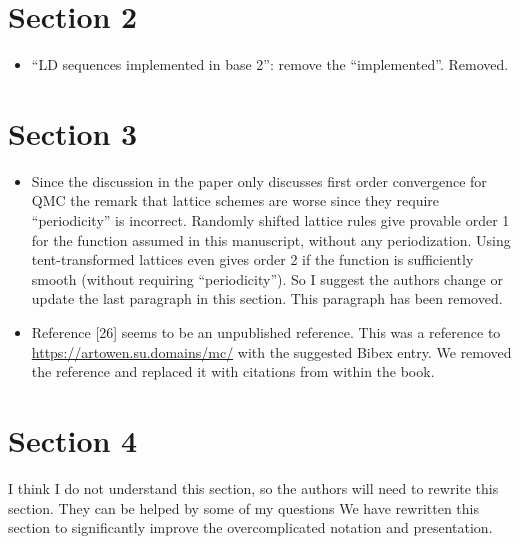 \documentclass{article}[12pt]
\newcommand{\Referee}[1]{{\color{blue} #1 \newline}}
\begin{document}
\section*{Section 2}

\begin{itemize}
    \item \Referee{``LD sequences implemented in base 2'': remove the ``implemented''.}Removed. 
\end{itemize}

\section*{Section 3}

\begin{itemize}
    \item \Referee{Since the discussion in the paper only discusses first order convergence for QMC the remark that lattice schemes are worse since they require ``periodicity'' is incorrect. Randomly shifted lattice rules give provable order 1 for the function assumed in this manuscript, without any periodization. Using tent-transformed lattices even gives order 2 if the function is sufficiently smooth (without requiring ``periodicity''). So I suggest the authors change or update the last paragraph in this section.}This paragraph has been removed.
    \item \Referee{Reference [26] seems to be an unpublished reference.}This was a reference to \url{https://artowen.su.domains/mc/} with the suggested Bibex entry. We removed the reference and replaced it with citations from within the book.  
\end{itemize}

\section*{Section 4}

\Referee{I think I do not understand this section, so the authors will need to rewrite this section. They can be helped by some of my questions}We have rewritten this section to significantly improve the overcomplicated notation and presentation. 
\end{document}
